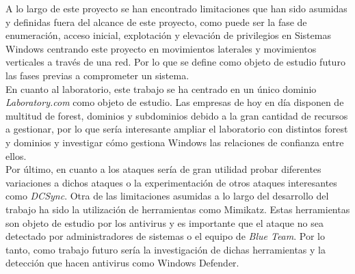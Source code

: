 A lo largo de este proyecto se han encontrado limitaciones que han sido asumidas y definidas fuera del alcance de este proyecto, como puede ser la fase de enumeración, acceso inicial, explotación y elevación de privilegios en Sistemas Windows centrando este proyecto en movimientos laterales y movimientos verticales a través de una red. Por lo que se define como objeto de estudio futuro las fases previas a comprometer un sistema. \\

En cuanto al laboratorio, este trabajo se ha centrado en un único dominio {\it Laboratory.com} como objeto de estudio. Las empresas de hoy en día disponen de multitud de forest, dominios y subdominios debido a la gran cantidad de recursos a gestionar, por lo que sería interesante ampliar el laboratorio con distintos forest y dominios y investigar cómo gestiona Windows las relaciones de confianza entre ellos. \\

Por último, en cuanto a los ataques sería de gran utilidad probar diferentes variaciones a dichos ataques o la experimentación de otros ataques interesantes como {\it DCSync}. Otra de las limitaciones asumidas a lo largo del desarrollo del trabajo ha sido la utilización de herramientas como Mimikatz. Estas herramientas son objeto de estudio por los antivirus y es importante que el ataque no sea detectado por administradores de sistemas o el equipo de {\it Blue Team}. Por lo tanto, como trabajo futuro sería la investigación de dichas herramientas y la detección que hacen antivirus como Windows Defender.
